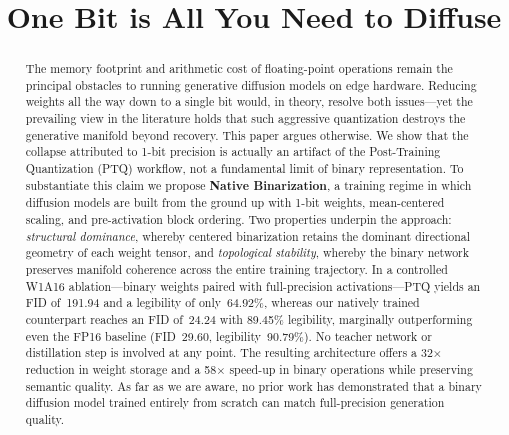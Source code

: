 \documentclass[conference]{IEEEtran}
\begin{document}
\title{One Bit is All You Need to Diffuse}

\author{
\and
{}
\and
{}
\and 
{}
\and
{}
}

\maketitle

\begin{abstract}
The memory footprint and arithmetic cost of floating-point operations remain the
principal obstacles to running generative diffusion models on edge hardware. Reducing
weights all the way down to a single bit would, in theory, resolve both issues---yet
the prevailing view in the literature holds that such aggressive quantization destroys
the generative manifold beyond recovery. This paper argues otherwise. We show that the
collapse attributed to 1-bit precision is actually an artifact of the
Post-Training Quantization (PTQ) workflow, not a fundamental limit of binary
representation. To substantiate this claim we propose \textbf{Native Binarization}, a
training regime in which diffusion models are built from the ground up with 1-bit
weights, mean-centered scaling, and pre-activation block ordering. Two properties
underpin the approach: \emph{structural dominance}, whereby centered binarization
retains the dominant directional geometry of each weight tensor, and
\emph{topological stability}, whereby the binary network preserves manifold coherence
across the entire training trajectory. In a controlled W1A16 ablation---binary weights
paired with full-precision activations---PTQ yields an FID of~191.94 and a legibility
of only~64.92\%, whereas our natively trained counterpart reaches an FID of~24.24 with
89.45\% legibility, marginally outperforming even the FP16 baseline (FID~29.60,
legibility~90.79\%). No teacher network or distillation step is involved at any point.
The resulting architecture offers a 32$\times$ reduction in weight storage and a
58$\times$ speed-up in binary operations while preserving semantic quality. As far as
we are aware, no prior work has demonstrated that a binary diffusion model trained
entirely from scratch can match full-precision generation quality.
\end{abstract}
\end{document}
